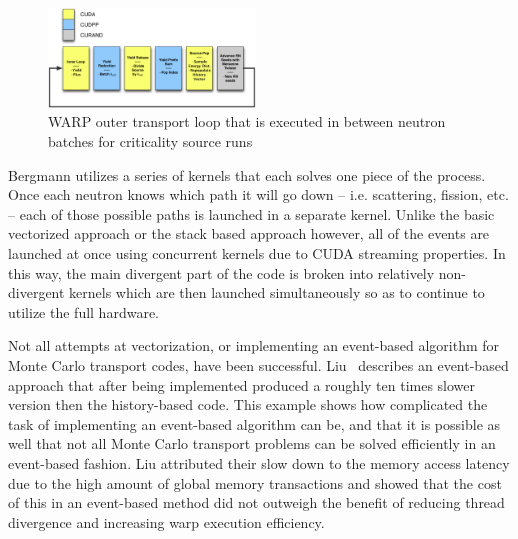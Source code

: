 \begin{figure}
\includegraphics[width=0.49\textwidth]{OuterLoopWARP}
\caption{WARP outer transport loop that is executed in between neutron batches for criticality source runs~\cite{2014development}}
\label{fig:outerLoopWARP}
\end{figure}

Bergmann utilizes a series of kernels that each solves one piece of the process.
%
Once each neutron knows which path it will go down -- i.e. scattering, fission, etc. -- each of those possible paths is launched in a separate kernel.
%
Unlike the basic vectorized approach or the stack based approach however, all of the events are launched at once using concurrent kernels due to CUDA streaming properties.
%
In this way, the main divergent part of the code is broken into relatively non-divergent kernels which are then launched simultaneously so as to continue to utilize the full hardware.

Not all attempts at vectorization, or implementing an event-based algorithm for Monte Carlo transport codes, have been successful.
%
Liu~\cite{liu2014comparative} describes an event-based approach that after being implemented produced a roughly ten times slower version then the history-based code.
%
This example shows how complicated the task of implementing an event-based algorithm can be, and that it is possible as well that not all Monte Carlo transport problems can be solved efficiently in an event-based fashion.
%
Liu attributed their slow down to the memory access latency due to the high amount of global memory transactions and showed that the cost of this in an event-based method did not outweigh the benefit of reducing thread divergence and increasing warp execution efficiency.





